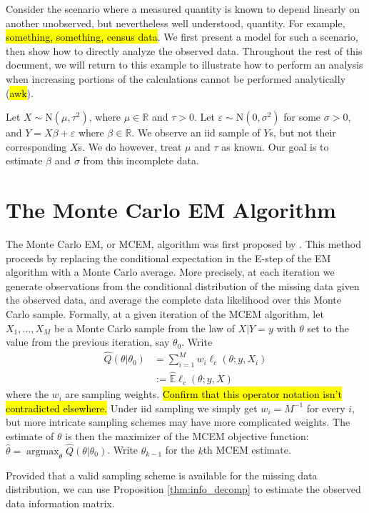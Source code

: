 \documentclass[11pt, oneside]{article}   	%
\newcommand{\bE}{\mathbb{E}}
\newcommand{\bR}{\mathbb{R}}
\DeclareMathOperator*{\argmax}{argmax}
\begin{document}
Consider the scenario where a measured quantity is known to depend linearly on another unobserved, but nevertheless well understood, quantity. For example, \hl{something, something, census data}. We first present a model for such a scenario, then show how to directly analyze the observed data. Throughout the rest of this document, we will return to this example to illustrate how to perform an analysis when increasing portions of the calculations cannot be performed analytically (\hl{awk}).

Let $X \sim \mathrm{N}(\mu, \tau^2)$, where $\mu \in \bR$ and $\tau > 0$. Let $\varepsilon \sim \mathrm{N}(0, \sigma^2)$ for some $\sigma>0$, and $Y = X \beta + \varepsilon$ where $\beta \in \bR$. We observe an iid sample of $Y$s, but not their corresponding $X$s. We do however, treat $\mu$ and $\tau$ as known. Our goal is to estimate $\beta$ and $\sigma$ from this incomplete data. 


\section{The Monte Carlo EM Algorithm}

The Monte Carlo EM, or MCEM, algorithm was first proposed by \citet{Wei90}. This method proceeds by replacing the conditional expectation in the E-step of the EM algorithm with a Monte Carlo average. More precisely, at each iteration we generate observations from the conditional distribution of the missing data given the observed data, and average the complete data likelihood over this Monte Carlo sample. Formally, at a given iteration of the MCEM algorithm, let $X_1,\ldots, X_M$ be a Monte Carlo sample from the law of $X|Y=y$ with $\theta$ set to the value from the previous iteration, say $\theta_0$. Write
%
\begin{align}
    \hat{Q}(\theta|\theta_0) &= \sum_{i=1}^M w_i \ell_c(\theta; y, X_i)\\
    &:= \hat{\bE} \ell_c (\theta; y, X)
\end{align}
%
where the $w_i$ are sampling weights. \hl{Confirm that this operator notation isn't contradicted elsewhere.} Under iid sampling we simply get $w_i = M^{-1}$ for every $i$, but more intricate sampling schemes may have more complicated weights. The estimate of $\theta$ is then the maximizer of the MCEM objective function: $\hat{\theta} = \argmax_\theta \hat{Q}(\theta|\theta_0)$. Write $\hat{\theta}_{k-1}$ for the $k$th MCEM estimate. 

Provided that a valid sampling scheme is available for the missing data distribution, we can use Proposition \ref{thm:info_decomp} to estimate the observed data information matrix. 
\end{document}
